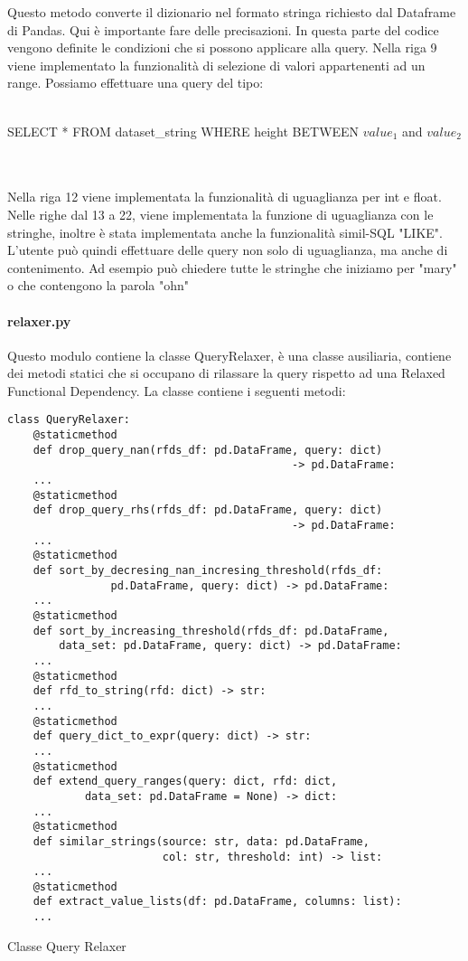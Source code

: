 Questo metodo converte il dizionario nel formato stringa richiesto dal Dataframe di Pandas.
Qui è importante fare delle precisazioni. In questa parte del codice vengono definite le condizioni che si possono applicare alla query.
Nella riga 9 viene implementato la funzionalità di selezione di valori appartenenti ad un range. Possiamo effettuare una query del tipo: \\~\\
\centerline{SELECT * FROM dataset{\_}string WHERE height BETWEEN $value_1$ and $value_2$}
\\~\\
Nella riga 12 viene implementata la funzionalità di uguaglianza per int e float.
Nelle righe dal 13 a 22, viene implementata la funzione di uguaglianza con le stringhe, inoltre è stata implementata anche la funzionalità simil-SQL "LIKE". L'utente può quindi effettuare delle query non solo di uguaglianza, ma anche di contenimento. Ad esempio può chiedere tutte le stringhe che iniziamo per "mary" o che contengono la parola "ohn"

\paragraph{relaxer.py}
Questo modulo contiene la classe QueryRelaxer, è una classe ausiliaria, contiene dei metodi statici che si occupano di rilassare la query rispetto ad una Relaxed Functional Dependency. La classe contiene i seguenti metodi:

\begin{listing}[H]
\begin{verbatim}
class QueryRelaxer:
    @staticmethod
    def drop_query_nan(rfds_df: pd.DataFrame, query: dict) 
                                            -> pd.DataFrame:
    ...
    @staticmethod
    def drop_query_rhs(rfds_df: pd.DataFrame, query: dict)
                                            -> pd.DataFrame:
    ...
    @staticmethod
    def sort_by_decresing_nan_incresing_threshold(rfds_df: 
                pd.DataFrame, query: dict) -> pd.DataFrame:
    ...
    @staticmethod
    def sort_by_increasing_threshold(rfds_df: pd.DataFrame,
        data_set: pd.DataFrame, query: dict) -> pd.DataFrame:
    ...
    @staticmethod
    def rfd_to_string(rfd: dict) -> str:
    ...
    @staticmethod
    def query_dict_to_expr(query: dict) -> str:
    ...
    @staticmethod
    def extend_query_ranges(query: dict, rfd: dict, 
            data_set: pd.DataFrame = None) -> dict:
    ...
    @staticmethod
    def similar_strings(source: str, data: pd.DataFrame,
                        col: str, threshold: int) -> list:
    ...
    @staticmethod
    def extract_value_lists(df: pd.DataFrame, columns: list):
    ...
\end{verbatim}
\caption{Classe Query Relaxer}
\label{Code:10}
\end{listing}

